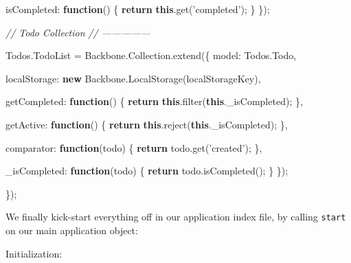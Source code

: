 \documentclass[9pt]{book}
\newenvironment{Shaded}{}{}
\newcommand{\KeywordTok}[1]{\textcolor[rgb]{0.00,0.44,0.13}{\textbf{{#1}}}}
\newcommand{\DataTypeTok}[1]{\textcolor[rgb]{0.56,0.13,0.00}{{#1}}}
\newcommand{\StringTok}[1]{\textcolor[rgb]{0.25,0.44,0.63}{{#1}}}
\newcommand{\CommentTok}[1]{\textcolor[rgb]{0.38,0.63,0.69}{\textit{{#1}}}}
\newcommand{\OtherTok}[1]{\textcolor[rgb]{0.00,0.44,0.13}{{#1}}}
\newcommand{\FunctionTok}[1]{\textcolor[rgb]{0.02,0.16,0.49}{{#1}}}
\newcommand{\NormalTok}[1]{{#1}}
\begin{document}
\begin{Shaded}
\begin{Highlighting}[]
    \DataTypeTok{isCompleted}\NormalTok{: }\KeywordTok{function}\NormalTok{() \{ }
      \KeywordTok{return} \KeywordTok{this}\NormalTok{.}\FunctionTok{get}\NormalTok{(}\StringTok{'completed'}\NormalTok{); }
    \NormalTok{\}}
  \NormalTok{\});}

  \CommentTok{// Todo Collection}
  \CommentTok{// ---------------}

  \OtherTok{Todos}\NormalTok{.}\FunctionTok{TodoList} \NormalTok{= }\OtherTok{Backbone}\NormalTok{.}\OtherTok{Collection}\NormalTok{.}\FunctionTok{extend}\NormalTok{(\{}
    \DataTypeTok{model}\NormalTok{: }\OtherTok{Todos}\NormalTok{.}\FunctionTok{Todo}\NormalTok{,}

    \DataTypeTok{localStorage}\NormalTok{: }\KeywordTok{new} \OtherTok{Backbone}\NormalTok{.}\FunctionTok{LocalStorage}\NormalTok{(localStorageKey),}

    \DataTypeTok{getCompleted}\NormalTok{: }\KeywordTok{function}\NormalTok{() \{}
      \KeywordTok{return} \KeywordTok{this}\NormalTok{.}\FunctionTok{filter}\NormalTok{(}\KeywordTok{this}\NormalTok{.}\FunctionTok{_isCompleted}\NormalTok{);}
    \NormalTok{\},}

    \DataTypeTok{getActive}\NormalTok{: }\KeywordTok{function}\NormalTok{() \{}
      \KeywordTok{return} \KeywordTok{this}\NormalTok{.}\FunctionTok{reject}\NormalTok{(}\KeywordTok{this}\NormalTok{.}\FunctionTok{_isCompleted}\NormalTok{);}
    \NormalTok{\},}

    \DataTypeTok{comparator}\NormalTok{: }\KeywordTok{function}\NormalTok{(todo) \{}
      \KeywordTok{return} \OtherTok{todo}\NormalTok{.}\FunctionTok{get}\NormalTok{(}\StringTok{'created'}\NormalTok{);}
    \NormalTok{\},}

    \DataTypeTok{_isCompleted}\NormalTok{: }\KeywordTok{function}\NormalTok{(todo) \{}
      \KeywordTok{return} \OtherTok{todo}\NormalTok{.}\FunctionTok{isCompleted}\NormalTok{();}
    \NormalTok{\}}
  \NormalTok{\});}

\NormalTok{\});}
\end{Highlighting}
\end{Shaded}

We finally kick-start everything off in our application index file, by
calling \texttt{start} on our main application object:

Initialization:

\begin{Shaded}
\end{Shaded}
\end{document}
